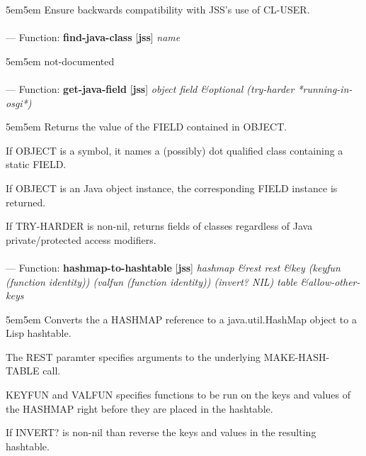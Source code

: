 \begin{adjustwidth}{5em}{5em}
Ensure backwards compatibility with JSS's use of CL-USER.
\end{adjustwidth}

\paragraph{}
\label{JSS:FIND-JAVA-CLASS}
--- Function: \textbf{find-java-class} [\textbf{jss}] \textit{name}

\begin{adjustwidth}{5em}{5em}
not-documented
\end{adjustwidth}

\paragraph{}
\label{JSS:GET-JAVA-FIELD}
--- Function: \textbf{get-java-field} [\textbf{jss}] \textit{object field \&optional (try-harder *running-in-osgi*)}

\begin{adjustwidth}{5em}{5em}
Returns the value of the FIELD contained in OBJECT.

If OBJECT is a symbol, it names a (possibly) dot qualified class
containing a static FIELD.

If OBJECT is an Java object instance, the corresponding FIELD instance
is returned.

If TRY-HARDER is non-nil, returns fields of classes regardless of Java
private/protected access modifiers.
\end{adjustwidth}

\paragraph{}
\label{JSS:HASHMAP-TO-HASHTABLE}
--- Function: \textbf{hashmap-to-hashtable} [\textbf{jss}] \textit{hashmap \&rest rest \&key (keyfun (function identity)) (valfun (function identity)) (invert? NIL) table \&allow-other-keys}

\begin{adjustwidth}{5em}{5em}
Converts the a HASHMAP reference to a java.util.HashMap object to a Lisp hashtable.

The REST paramter specifies arguments to the underlying MAKE-HASH-TABLE call.

KEYFUN and VALFUN specifies functions to be run on the keys and values
of the HASHMAP right before they are placed in the hashtable.

If INVERT? is non-nil than reverse the keys and values in the resulting hashtable.
\end{adjustwidth}

